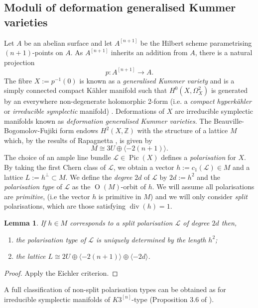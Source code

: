 \documentclass[11pt]{article}
\newtheorem{lem}[thm]{Lemma}
\newcommand{\ZZ}{\mathbb{Z}}
\newcommand{\lc}{\mathcal{L}}
\newcommand{\la}{\langle}
\newcommand{\ra}{\rangle}
\newcommand{\opn}{\operatorname}
\newcommand{\op}{\oplus}
\newcommand{\beq}{\begin{equation*}}
\newcommand{\eeq}{\end{equation*}}
\begin{document}
\subsection{Moduli of deformation generalised Kummer varieties}
Let $A$ be an abelian surface and let $A^{[n+1]}$ be the Hilbert scheme parametrising $(n+1)$-points on $A$.
As $A^{[n+1]}$ inherits an addition from $A$, there is a natural projection
\beq
p:A^{[n+1]} \rightarrow A.
\eeq
The fibre $X:=p^{-1}(0)$ is known as a \emph{generalised Kummer variety} and is a simply connected compact K\"ahler manifold such that $H^0(X, \Omega_X^2)$ is generated by an everywhere non-degenerate holomorphic 2-form (i.e. a \emph{compact hyperk\"ahler} or \emph{irreducible symplectic} manifold) \cite{beauvillesexamples}.
Deformations of $X$ are irreducible symplectic manifolds known as \emph{deformation generalised Kummer varieties}.
The Beauville-Bogomolov-Fujiki form \cite{beauvillesexamples} endows $H^2(X, \ZZ)$ with the structure of a lattice $M$ which, by the results of Rapagnetta \cite{rapagnetta2},
is given by
\begin{equation}\label{bblattice}
M \cong 3U \op \la -2(n+1) \ra.
\end{equation}
The choice of an ample line bundle $\lc \in \opn{Pic}(X)$ defines a \emph{polarisation} for $X$.
By taking the first Chern class of $\lc$, we obtain a vector $h:=c_1(\lc) \in M$ and a lattice  $L:=h^{\perp} \subset M$.
We define the \emph{degree} $2d$ of $\lc$  by $2d:=h^2$ and the \emph{polarisation type} of $\lc$  as the $\opn{O}(M)$-orbit of $h$.
We will assume  all polarisations are \emph{primitive},  (i.e the vector $h$ is primitive in $M$) and we will only consider  \emph{split} polarisations, which are those satisfying $\opn{div}(h)=1$.
\begin{lem}
  If $h \in M$ corresponds to a split polarisation $\lc$ of degree $2d$ then, 
  \begin{enumerate}
  \item the polarisation type of $\lc$ is uniquely determined by the length $h^2$;
  \item the lattice $L \cong 2U \op \la -2(n+1) \ra \op \la -2d \ra$.
  \end{enumerate}
\end{lem}
\begin{proof}
  Apply the Eichler criterion.
\end{proof}
A full classification of non-split polarisation types can be obtained  as for irreducible symplectic manifolds of $K3^{[n]}$-type (Proposition 3.6 of \cite{ModuliSpacesOfIrreducibleSymplecticManifolds}).
\end{document}
